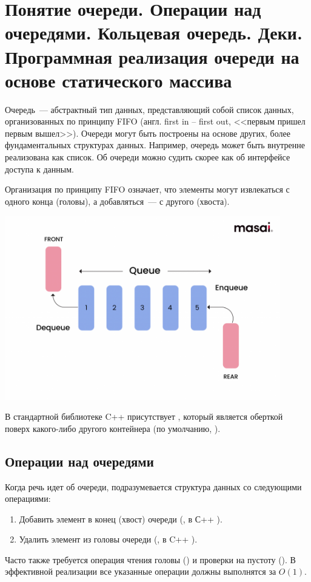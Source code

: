 %
%

\section{Понятие очереди. Операции над очередями. Кольцевая очередь. Деки.  Программная реализация очереди на основе статического массива}
Очередь~--- абстрактный тип данных, представляющий собой список данных, организованных по принципу FIFO (англ. first in -- first out, <<первым пришел первым вышел>>).
Очереди могут быть построены на основе других, более фундаментальных структурах данных. Например, очередь может быть внутренне реализована как
список. Об очереди можно судить скорее как об интерфейсе доступа к данным.

Организация по принципу FIFO означает, что элементы могут извлекаться с одного конца (головы), а добавляться~--- с другого (хвоста).

\includegraphics[width=0.9\textwidth]{resources/19-26/queue.png}

В стандартной библиотеке C++ присутствует  , который является оберткой поверх
какого-либо другого контейнера (по умолчанию, ).

\subsection{Операции над очередями}
Когда речь идет об очереди, подразумевается структура данных со следующими операциями:
\begin{enumerate}
  \item Добавить элемент в конец (хвост) очереди (, в С++ ).
  \item Удалить элемент из головы очереди (, в C++ ).
\end{enumerate}
%
Часто также требуется операция чтения головы () и проверки на пустоту (). В эффективной реализации
все указанные операции должны выполнятся за \(O(1)\).

